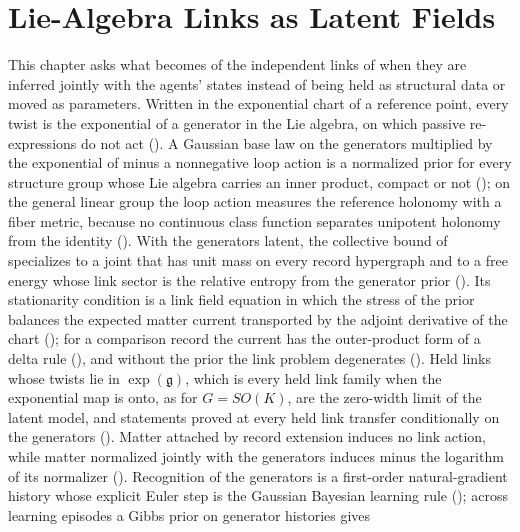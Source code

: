 \chapter[Lie-Algebra Links as Latent Fields]{Lie-Algebra Links as Latent Fields}
\label{ch:links}

This chapter asks what becomes of the independent links of  when they are
inferred jointly with the agents' states instead of being held as structural data or moved as
parameters. Written in the exponential chart of a reference point, every twist is the exponential of a
generator in the Lie algebra, on which passive re-expressions do not act
(). A Gaussian base law on the generators
multiplied by the exponential of minus a nonnegative loop action is a normalized prior for every
structure group whose Lie algebra carries an inner product, compact or not
(); on the general linear group the loop action measures the reference
holonomy with a fiber metric, because no continuous class function separates unipotent holonomy from
the identity (). With the generators latent,
the collective bound of  specializes to a joint that has unit mass on
every record hypergraph and to a free energy whose link sector is the relative entropy from the
generator prior (). Its
stationarity condition is a link field equation in which the stress of the prior balances the expected
matter current transported by the adjoint derivative of the chart ();
for a comparison record the current has the outer-product form of a delta rule
(), and without the prior the link problem degenerates
(). Held links whose twists lie in $\exp(\mathfrak g)$, which is every
held link family when the exponential map is onto, as for $G=SO(K)$, are the zero-width limit of the
latent model, and statements proved at every held link transfer conditionally on the generators
(). Matter attached by record extension
induces no link action, while matter normalized jointly with the generators induces minus the logarithm
of its normalizer (). Recognition of the generators is a first-order
natural-gradient history whose explicit Euler step is the Gaussian Bayesian learning rule
(); across learning episodes a Gibbs prior on generator histories gives
